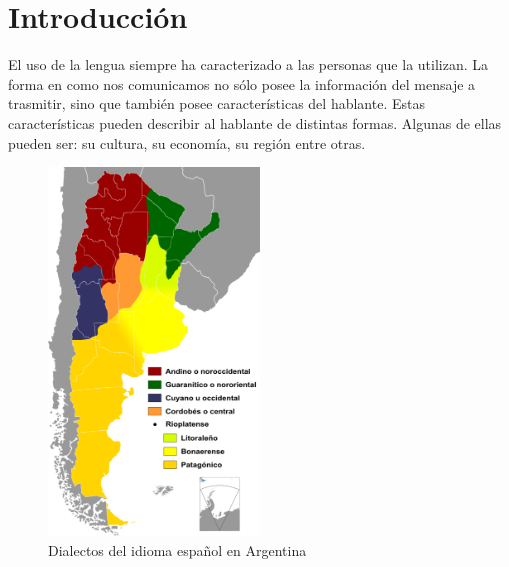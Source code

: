 \documentclass[11pt,a4paper,twoside]{tesis}
\begin{document}
\def\titulo{Licenciado }

\def\autor{Fernando Bugni}
\def\tituloTesis{Recolección online de grabaciones para el estudio de las variantes argentinas del español}
\def\runtitulo{Recolección online de grabaciones para el estudio de las variantes argentinas del español}
\def\runtitle{Star Wars: Rebellion and Empire}
\def\director{Agustín Gravano}
\def\codirector{Miguel Martínez Soler}
\def\lugar{Buenos Aires, 2014}


\frontmatter
\pagestyle{empty}


%

\cleardoublepage

\cleardoublepage

\cleardoublepage
\tableofcontents

\mainmatter
\pagestyle{headings}


\chapter{Introducción}


El uso de la lengua siempre ha caracterizado a las personas que la utilizan. La forma en como nos comunicamos no sólo posee la información del mensaje a trasmitir, sino que también posee características del hablante. Estas características pueden describir al hablante de distintas formas. Algunas de ellas pueden ser: su cultura, su economía, su región entre otras. 

\begin{figure}[h!]
    \includegraphics[width=0.5\textwidth]{Dialectos_del_idioma_espanol_en_Argentina} 
    \caption{Dialectos del idioma español en Argentina}
\end{figure}
\end{document}
